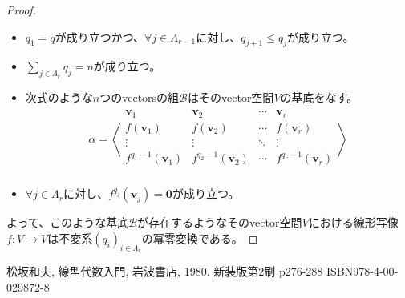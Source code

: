\documentclass[dvipdfmx]{jsarticle}
\begin{document}
\begin{proof}
\begin{itemize}
\item
  $q_{1} = q$が成り立つかつ、$\forall j \in \varLambda_{r - 1}$に対し、$q_{j + 1} \leq q_{j}$が成り立つ。
\item
  $\sum_{j \in \varLambda_{r}} q_{j} = n$が成り立つ。
\item
  次式のような$n$つのvectorsの組$\mathcal{B}$はそのvector空間$V$の基底をなす。
\begin{align*}
\alpha = \left\langle \begin{matrix}
\mathbf{v}_{1} & \mathbf{v}_{2} & \cdots & \mathbf{v}_{r} \\
f\left( \mathbf{v}_{1} \right) & f\left( \mathbf{v}_{2} \right) & \cdots & f\left( \mathbf{v}_{r} \right) \\
 \vdots & \vdots & \ddots & \vdots \\
f^{q_{1} - 1}\left( \mathbf{v}_{1} \right) & f^{q_{2} - 1}\left( \mathbf{v}_{2} \right) & \cdots & f^{q_{r} - 1}\left( \mathbf{v}_{r} \right) \\
\end{matrix} \right\rangle
\end{align*}
\item
  $\forall j \in \varLambda_{r}$に対し、$f^{q_{j}}\left( \mathbf{v}_{j} \right) = \mathbf{0}$が成り立つ。
\end{itemize}
よって、このような基底$\mathcal{B}$が存在するようなそのvector空間$V$における線形写像$f:V \rightarrow V$は不変系$\left( q_{i} \right)_{i \in \varLambda_{r}}$の冪零変換である。
\end{proof}
\begin{thebibliography}{50}
    松坂和夫, 線型代数入門, 岩波書店, 1980. 新装版第2刷 p276-288 ISBN978-4-00-029872-8
\end{thebibliography}
\end{document}
